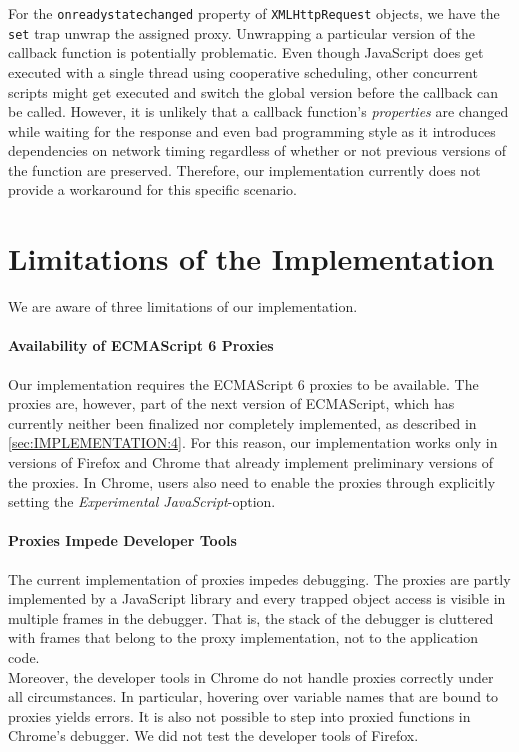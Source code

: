 For the \lstinline{onreadystatechanged} property of \lstinline{XMLHttpRequest} objects, we have the \lstinline{set} trap unwrap the assigned proxy.
Unwrapping a particular version of the callback function is potentially problematic.
Even though JavaScript does get executed with a single thread using cooperative scheduling, other concurrent scripts might get executed and switch the global version before the callback can be called.
However, it is unlikely that a callback function's \emph{properties} are changed while waiting for the response and even bad programming style as it introduces dependencies on network timing regardless of whether or not previous versions of the function are preserved.
Therefore, our implementation currently does not provide a workaround for this specific scenario. 





\section{Limitations of the Implementation}

We are aware of three limitations of our implementation.

\paragraph{Availability of ECMAScript 6 Proxies}
Our implementation requires the ECMAScript 6 proxies to be available.
The proxies are, however, part of the next version of ECMAScript, which has currently neither been finalized nor completely implemented, as described in \ref{sec:IMPLEMENTATION:4}.
For this reason, our implementation works only in versions of Firefox and Chrome that already implement preliminary versions of the proxies.
In Chrome, users also need to enable the proxies through explicitly setting the \emph{Experimental JavaScript}-option.

\paragraph{Proxies Impede Developer Tools}
The current implementation of proxies impedes debugging.
The proxies are partly implemented by a JavaScript library and every trapped object access is visible in multiple frames in the debugger.
That is, the stack of the debugger is cluttered with frames that belong to the proxy implementation, not to the application code.\\
Moreover, the developer tools in Chrome do not handle proxies correctly under all circumstances.
In particular, hovering over variable names that are bound to proxies yields errors.
It is also not possible to step into proxied functions in Chrome's debugger.
We did not test the developer tools of Firefox.


